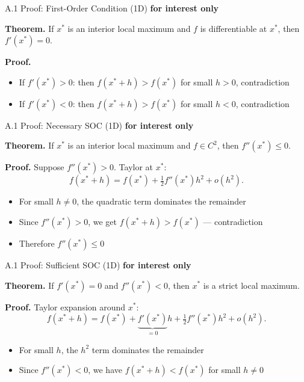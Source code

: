 \documentclass[11pt,aspectratio=169]{beamer}
\newcommand{\InterestOnly}{\textcolor{mAccent}{\textbf{for interest only}}}
\begin{document}
\hypertarget{appendix:soc_1d}{}
\begin{frame}{A.1 Proof: First-Order Condition (1D)}
  \small
  \InterestOnly
  
  \textbf{Theorem.} If $x^*$ is an interior local maximum and $f$ is differentiable at $x^*$, then $f'(x^*) = 0$.
  
  \textbf{Proof.}
  
  \begin{itemize}
    \item If $f'(x^*) > 0$: then $f(x^* + h) > f(x^*)$ for small $h > 0$, contradiction
    
    \item If $f'(x^*) < 0$: then $f(x^* + h) > f(x^*)$ for small $h < 0$, contradiction
  \end{itemize}
\end{frame}

\begin{frame}{A.1 Proof: Necessary SOC (1D)}
  \small
  \InterestOnly
  
  \textbf{Theorem.} If $x^*$ is an interior local maximum and $f \in C^2$, then $f''(x^*) \leq 0$.
  
  \textbf{Proof.} Suppose $f''(x^*) > 0$. Taylor at $x^*$:
  \[
    f(x^* + h)
    =
    f(x^*) + \tfrac12 f''(x^*) h^2 + o(h^2).
  \]
  
  \begin{itemize}
    \item For small $h \neq 0$, the quadratic term dominates the remainder
    
    \item Since $f''(x^*) > 0$, we get $f(x^* + h) > f(x^*)$ --- contradiction
    
    \item Therefore $f''(x^*) \leq 0$
  \end{itemize}
\end{frame}

\begin{frame}{A.1 Proof: Sufficient SOC (1D)}
  \small
  \InterestOnly
  
  \textbf{Theorem.} If $f'(x^*) = 0$ and $f''(x^*) < 0$, then $x^*$ is a strict local maximum.
  
  \textbf{Proof.} Taylor expansion around $x^*$:
  \[
    f(x^* + h) = f(x^*) + \underbrace{f'(x^*)}_{=0} h + \tfrac12 f''(x^*) h^2 + o(h^2).
  \]
  
  \begin{itemize}
    \item For small $h$, the $h^2$ term dominates the remainder
    
    \item Since $f''(x^*) < 0$, we have $f(x^* + h) < f(x^*)$ for small $h \neq 0$
  \end{itemize}
\end{frame}
\end{document}
